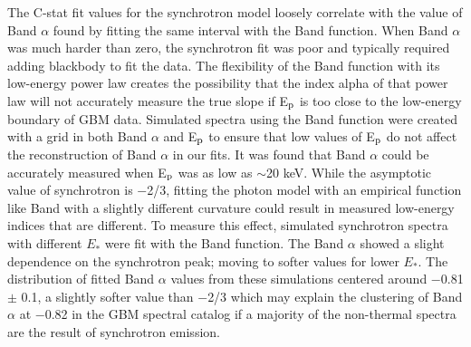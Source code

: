 The C-stat fit values for the synchrotron model loosely correlate with
the value of Band $\alpha$ found by fitting the same interval with the
Band function. When Band $\alpha$ was much harder than zero, the
synchrotron fit was poor and typically required adding blackbody to
fit the data. The flexibility of the Band function with its low-energy
power law creates the possibility that the index alpha of that power
law will not accurately measure the true slope if E$_{\rm p}$ is too
close to the low-energy boundary of GBM data. Simulated spectra using
the Band function were created with a grid in both Band $\alpha$ and
E$_{\rm p}$ to ensure that low values of E$_{\rm p}$ do not affect the
reconstruction of Band $\alpha$ in our fits. It was found that Band
$\alpha$ could be accurately measured when E$_{\rm p}$ was as low as
$\sim$20 keV. While the asymptotic value of synchrotron is $-$2/3,
fitting the photon model with an empirical function like Band with a
slightly different curvature could result in measured low-energy
indices that are different. To measure this effect, simulated
synchrotron spectra with different $E_*$ were fit with the Band
function. The Band $\alpha$ showed a slight dependence on the
synchrotron peak; moving to softer values for lower $E_*$. The
distribution of fitted Band $\alpha$ values from these simulations
centered around $-$0.81 $\pm$ 0.1, a slightly softer value than $-$2/3
which may explain the clustering of Band $\alpha$ at $-$0.82 in the
GBM spectral catalog \cite{Goldstein:2012} if a majority of the
non-thermal spectra are the result of synchrotron emission.



